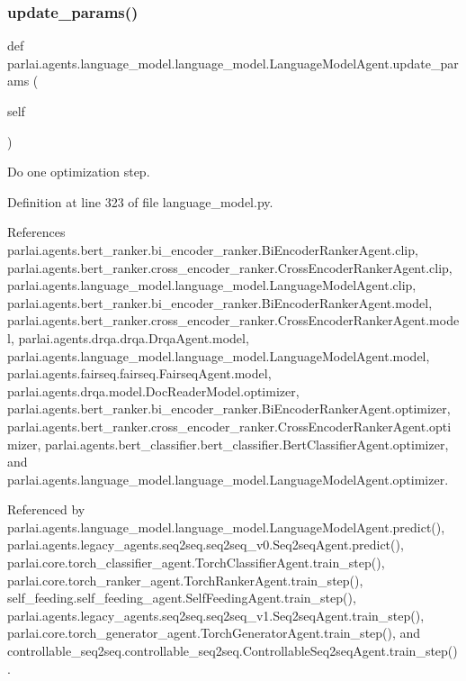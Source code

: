 \subsubsection{\texorpdfstring{update\+\_\+params()}{update\_params()}}
{\footnotesize\ttfamily def parlai.\+agents.\+language\+\_\+model.\+language\+\_\+model.\+Language\+Model\+Agent.\+update\+\_\+params (\begin{DoxyParamCaption}\item[{}]{self }\end{DoxyParamCaption})}

\begin{DoxyVerb}Do one optimization step.\end{DoxyVerb}
 

Definition at line 323 of file language\+\_\+model.\+py.



References parlai.\+agents.\+bert\+\_\+ranker.\+bi\+\_\+encoder\+\_\+ranker.\+Bi\+Encoder\+Ranker\+Agent.\+clip, parlai.\+agents.\+bert\+\_\+ranker.\+cross\+\_\+encoder\+\_\+ranker.\+Cross\+Encoder\+Ranker\+Agent.\+clip, parlai.\+agents.\+language\+\_\+model.\+language\+\_\+model.\+Language\+Model\+Agent.\+clip, parlai.\+agents.\+bert\+\_\+ranker.\+bi\+\_\+encoder\+\_\+ranker.\+Bi\+Encoder\+Ranker\+Agent.\+model, parlai.\+agents.\+bert\+\_\+ranker.\+cross\+\_\+encoder\+\_\+ranker.\+Cross\+Encoder\+Ranker\+Agent.\+model, parlai.\+agents.\+drqa.\+drqa.\+Drqa\+Agent.\+model, parlai.\+agents.\+language\+\_\+model.\+language\+\_\+model.\+Language\+Model\+Agent.\+model, parlai.\+agents.\+fairseq.\+fairseq.\+Fairseq\+Agent.\+model, parlai.\+agents.\+drqa.\+model.\+Doc\+Reader\+Model.\+optimizer, parlai.\+agents.\+bert\+\_\+ranker.\+bi\+\_\+encoder\+\_\+ranker.\+Bi\+Encoder\+Ranker\+Agent.\+optimizer, parlai.\+agents.\+bert\+\_\+ranker.\+cross\+\_\+encoder\+\_\+ranker.\+Cross\+Encoder\+Ranker\+Agent.\+optimizer, parlai.\+agents.\+bert\+\_\+classifier.\+bert\+\_\+classifier.\+Bert\+Classifier\+Agent.\+optimizer, and parlai.\+agents.\+language\+\_\+model.\+language\+\_\+model.\+Language\+Model\+Agent.\+optimizer.



Referenced by parlai.\+agents.\+language\+\_\+model.\+language\+\_\+model.\+Language\+Model\+Agent.\+predict(), parlai.\+agents.\+legacy\+\_\+agents.\+seq2seq.\+seq2seq\+\_\+v0.\+Seq2seq\+Agent.\+predict(), parlai.\+core.\+torch\+\_\+classifier\+\_\+agent.\+Torch\+Classifier\+Agent.\+train\+\_\+step(), parlai.\+core.\+torch\+\_\+ranker\+\_\+agent.\+Torch\+Ranker\+Agent.\+train\+\_\+step(), self\+\_\+feeding.\+self\+\_\+feeding\+\_\+agent.\+Self\+Feeding\+Agent.\+train\+\_\+step(), parlai.\+agents.\+legacy\+\_\+agents.\+seq2seq.\+seq2seq\+\_\+v1.\+Seq2seq\+Agent.\+train\+\_\+step(), parlai.\+core.\+torch\+\_\+generator\+\_\+agent.\+Torch\+Generator\+Agent.\+train\+\_\+step(), and controllable\+\_\+seq2seq.\+controllable\+\_\+seq2seq.\+Controllable\+Seq2seq\+Agent.\+train\+\_\+step().

